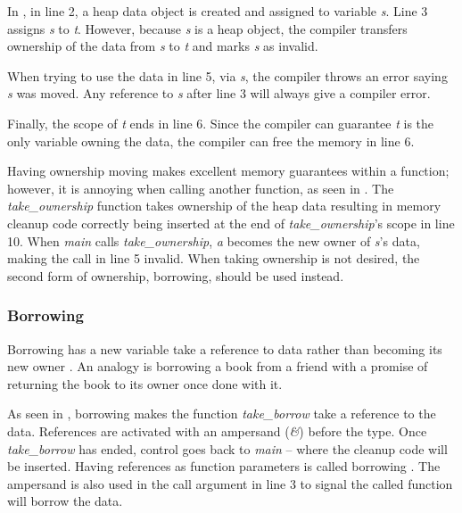 
In , in line 2, a heap data object is created and assigned to variable \textit{s}.
Line 3 assigns \textit{s} to \textit{t}.
However, because \textit{s} is a heap object, the compiler transfers ownership of the data from \textit{s} to \textit{t} and marks \textit{s} as invalid.

When trying to use the data in line 5, via \textit{s}, the compiler throws an error saying \textit{s} was moved.
Any reference to \textit{s} after line 3 will always give a compiler error.

Finally, the scope of \textit{t} ends in line 6.
Since the compiler can guarantee \textit{t} is the only variable owning the data, the compiler can free the memory in line 6.


Having ownership moving makes excellent memory guarantees within a function; however, it is annoying when calling another function, as seen in .
The \textit{take\_ownership} function takes ownership of the heap data resulting in memory cleanup code correctly being inserted at the end of \textit{take\_ownership}'s scope in line 10.
When \textit{main} calls \textit{take\_ownership}, \textit{a} becomes the new owner of \textit{s}'s data, making the call in line 5 invalid.
When taking ownership is not desired, the second form of ownership, borrowing, should be used instead.

\subsubsection{Borrowing}

Borrowing has a new variable take a reference to data rather than becoming its new owner \cite{klabnik_2019_01}.
An analogy is borrowing a book from a friend with a promise of returning the book to its owner once done with it.


As seen in , borrowing makes the function \textit{take\_borrow} take a reference to the data.
References are activated with an ampersand (\textit{\&}) before the type.
Once \textit{take\_borrow} has ended, control goes back to \textit{main} -- where the cleanup code will be inserted.
Having references as function parameters is called borrowing \cite{klabnik_2019_01}.
The ampersand is also used in the call argument in line 3 to signal the called function will borrow the data.

